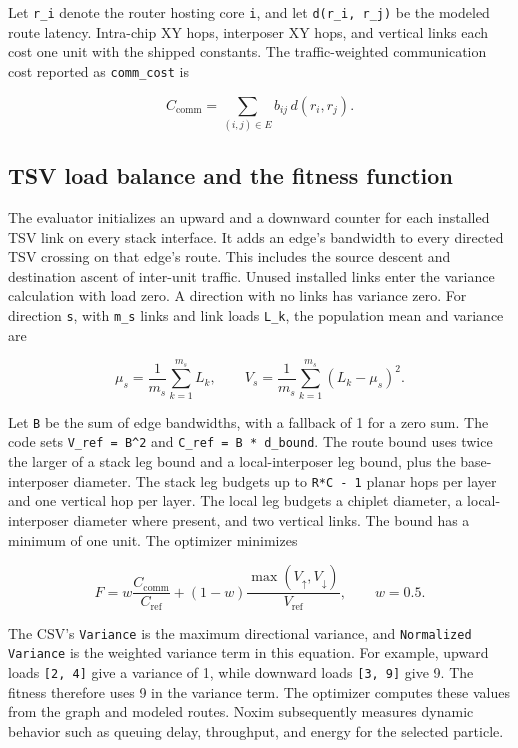 \documentclass[11pt,a4paper]{article}
\begin{document}
Let \texttt{r\_i} denote the router hosting core \texttt{i}, and let \texttt{d(r\_i, r\_j)} be the modeled route latency. Intra-chip XY hops, interposer XY hops, and vertical links each cost one unit with the shipped constants. The traffic-weighted communication cost reported as \texttt{comm\_cost} is

\[
C_{\mathrm{comm}} = \sum_{(i,j)\in E} b_{ij}\,d(r_i,r_j).
\]

\subsection{TSV load balance and the fitness function}

The evaluator initializes an upward and a downward counter for each installed TSV link on every stack interface. It adds an edge's bandwidth to every directed TSV crossing on that edge's route. This includes the source descent and destination ascent of inter-unit traffic. Unused installed links enter the variance calculation with load zero. A direction with no links has variance zero. For direction \texttt{s}, with \texttt{m\_s} links and link loads \texttt{L\_k}, the population mean and variance are

\[
\mu_s = \frac{1}{m_s}\sum_{k=1}^{m_s}L_k,
\qquad
V_s = \frac{1}{m_s}\sum_{k=1}^{m_s}(L_k-\mu_s)^2.
\]

Let \texttt{B} be the sum of edge bandwidths, with a fallback of 1 for a zero sum. The code sets \texttt{V\_ref = B\textasciicircum{}2} and \texttt{C\_ref = B * d\_bound}. The route bound uses twice the larger of a stack leg bound and a local-interposer leg bound, plus the base-interposer diameter. The stack leg budgets up to \texttt{R*C - 1} planar hops per layer and one vertical hop per layer. The local leg budgets a chiplet diameter, a local-interposer diameter where present, and two vertical links. The bound has a minimum of one unit. The optimizer minimizes

\[
F = w\frac{C_{\mathrm{comm}}}{C_{\mathrm{ref}}}
  + (1-w)\frac{\max(V_{\uparrow},V_{\downarrow})}{V_{\mathrm{ref}}},
\qquad w=0.5.
\]

The CSV's \texttt{Variance} is the maximum directional variance, and \texttt{Normalized Variance} is the weighted variance term in this equation. For example, upward loads \texttt{[2, 4]} give a variance of 1, while downward loads \texttt{[3, 9]} give 9. The fitness therefore uses 9 in the variance term. The optimizer computes these values from the graph and modeled routes. Noxim subsequently measures dynamic behavior such as queuing delay, throughput, and energy for the selected particle.
\end{document}
